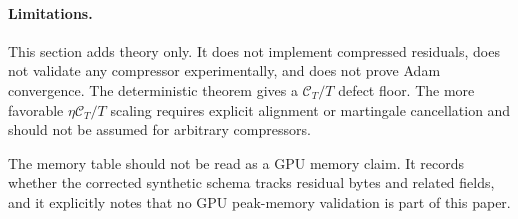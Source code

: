 \paragraph{Limitations.}
This section adds theory only. It does not implement compressed residuals, does
not validate any compressor experimentally, and does not prove Adam
convergence. The deterministic theorem gives a $\mathcal C_T/T$ defect floor.
The more favorable $\eta\mathcal C_T/T$ scaling requires explicit alignment or
martingale cancellation and should not be assumed for arbitrary compressors.

\begin{table}[h]
\caption{Claim--evidence matrix for the integrated draft.}
\label{tab:claim-evidence}

\end{table}

\begin{table}[h]
\caption{Synthetic CPU memory/runtime accounting.}
\label{tab:memory-accounting}

\end{table}

The memory table should not be read as a GPU memory claim. It records whether
the corrected synthetic schema tracks residual bytes and related fields, and it
explicitly notes that no GPU peak-memory validation is part of this paper.
